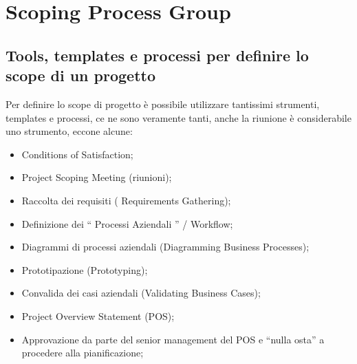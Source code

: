 \section{Scoping Process Group}
\subsection{Tools, templates e processi per definire lo scope di un progetto}
Per definire lo scope di progetto è possibile utilizzare tantissimi strumenti, templates e processi, ce ne sono veramente tanti, anche la riunione è considerabile uno strumento, eccone alcune:
\begin{itemize}
	\item Conditions of Satisfaction;
	\item Project Scoping Meeting (riunioni);
	\item Raccolta dei requisiti ( Requirements Gathering);
	\item Definizione dei “ Processi Aziendali ” / Workflow;
	\item Diagrammi di processi aziendali (Diagramming Business Processes);
	\item Prototipazione (Prototyping);
	\item Convalida dei casi aziendali (Validating Business Cases);
	\item Project Overview Statement (POS);
	\item Approvazione da parte del senior management del POS e “nulla osta” a procedere alla pianificazione;
\end{itemize}
